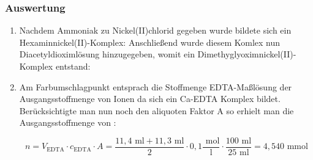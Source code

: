 \documentclass{scrartcl}
\begin{document}
\subsubsection{Auswertung}
\begin{enumerate}[label=\alph*)]
	\item Nachdem Ammoniak zu Nickel(II)chlorid gegeben wurde bildete sich ein Hexaminnickel(II)-Komplex:
Anschließend wurde diesem Komlex nun Diacetyldioximlösung hinzugegeben, womit ein Dimethyglyoximnickel(II)-Komplex entstand:\\

\item Am Farbumschlagpunkt entsprach die Stoffmenge EDTA-Maßlösung der Ausgangsstoffmenge von  Ionen da sich ein Ca-EDTA Komplex bildet. Berücksichtigte man nun noch den aliquoten Faktor A so erhielt man die Ausgangsstoffmenge von :
	
\begin{equation}
	n=V_{\text{EDTA}}\cdot c_{\text{EDTA}}\cdot A
	=\frac{11,4\text{ ml}+11,3\text{ ml}}{2}\cdot 0,1\frac{\text{ mol}}{\text{l}}\cdot \frac{100\text{ ml}}{25\text{ ml}}
	=4,540\text{ mmol}
\end{equation}
\end{enumerate}
\begin{minipage}[t]{.45\textwidth}
	\centering
\end{minipage}
\hfill
\end{document}
